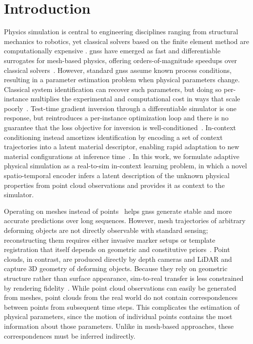 \section{Introduction}
\label{sec:introduction}

\glsresetall

Physics simulation is central to engineering disciplines ranging from structural mechanics to robotics, yet classical solvers based on the finite element method are computationally expensive \citep{zienkiewicz2005finite,stanova2015finite}.
\glspl{gns} have emerged as fast and differentiable surrogates for mesh-based physics, offering orders-of-magnitude speedups over classical solvers~\citep{battaglia2016interaction, pfaff2020learning, brandstetter2021message, linkerhagner2023grounding, wurth2025diffusion}.
However, standard \glspl{gns} assume known process conditions, resulting in a parameter estimation problem when physical parameters change.
Classical system identification can recover such parameters, but doing so per-instance multiplies the experimental and computational cost in ways that scale poorly~\citep{aastrom1971system, lennart1999system, isakov2006inverse, wu2015galileo, murthy2020gradsim, antonova2023rethinking}.
Test-time gradient inversion through a differentiable simulator is one response, but reintroduces a per-instance optimization loop and there is no guarantee that the loss objective for inversion is well-conditioned~\citep{qzhao2022graphpde, wang2024latent}.
In-context conditioning instead amortizes identification by encoding a set of context trajectories into a latent material descriptor, enabling rapid adaptation to new material configurations at inference time~\citep{dahlinger2025mango}.
In this work, we formulate adaptive physical simulation as a real-to-sim in-context learning problem, in which a novel spatio-temporal encoder infers a latent description of the unknown physical properties from point cloud observations and provides it as context to the simulator.

Operating on meshes instead of points~\citep{robocook23, hd-vpd} helps \glspl{gns} generate stable and more accurate predictions over long sequences.
However, mesh trajectories of arbitrary deforming objects are not directly observable with standard sensing; reconstructing them requires either invasive marker setups or template registration that itself depends on geometric and constitutive priors~\citep{MansourZK24,LoperMB14}.
Point clouds, in contrast, are produced directly by depth cameras and LiDAR and capture 3D geometry of deforming objects.
Because they rely on geometric structure rather than surface appearance, sim-to-real transfer is less constrained by rendering fidelity~\citep{dexpoint, 3DDA, adapt3r, pointmappolicy}.
While point cloud observations can easily be generated from meshes, point clouds from the real world do not contain correspondences between points from subsequent time steps.
This complicates the estimation of physical parameters, since the motion of individual points contains the most information about those parameters.
Unlike in mesh-based approaches, these correspondences must be inferred indirectly.


